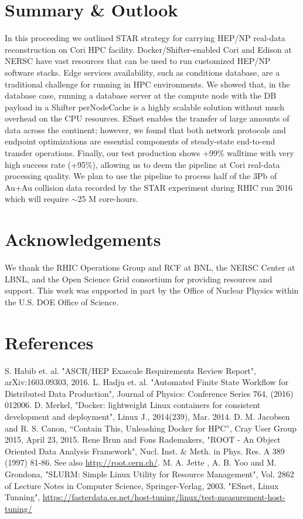 \documentclass[a4paper]{jpconf}
\begin{document}
\section{Summary \& Outlook}
In this proceeding we outlined STAR strategy for carrying HEP/NP real-data
reconstruction on Cori HPC facility. Docker/Shifter-enabled Cori and Edison at
NERSC have vast resources that can be used to run customized HEP/NP software
stacks. Edge services availability, such as conditions database, are a
traditional challenge for running in HPC environments. We showed that, in the
database case, running a database server at the compute node with the DB
payload in a Shifter perNodeCache is a highly scalable solution without much
overhead on the CPU resources. ESnet enables the transfer of large amounts of
data across the continent; however, we found that both network protocols and
endpoint optimizations are essential components of steady-state end-to-end
transfer operations.  Finally, our test production shows +99\% walltime with
very high success rate (+95\%), allowing us to deem the pipeline at Cori
real-data processing quality. We plan to use the pipeline to process half of
the 3Pb of Au+Au collision data recorded by the STAR experiment during RHIC run
2016 which  will require $\sim$25 M core-hours. 

\section{Acknowledgements}
We thank the RHIC Operations Group and RCF at BNL, the NERSC Center at LBNL, and the Open Science Grid consortium for providing resources and support. This work was supported in part by the Office of Nuclear Physics within the U.S. DOE Office of Science.

\section*{References}
\begin{thebibliography}{9}
 S. Habib et. al. "ASCR/HEP Exascale Requirements Review Report",  arXiv:1603.09303, 2016.
 L. Hadju et. al. "Automated Finite State Workflow for Distributed Data Production", Journal of Physics: Conference Series 764, (2016) 012006.
 D. Merkel, "Docker: lightweight Linux containers for consistent development and deployment", Linux J., 2014(239), Mar. 2014.
 D. M. Jacobsen and R. S. Canon, “Contain This, Unleashing Docker for HPC”, Cray User Group 2015, April 23, 2015.
 Rene Brun and Fons Rademakers, "ROOT - An Object Oriented Data Analysis Framework", Nucl. Inst. \& Meth. in Phys. Res. A 389 (1997) 81-86. See also \url{http://root.cern.ch/}.
 M. A. Jette , A. B. Yoo and  M. Grondona, "SLURM: Simple Linux Utility for Resource Management", Vol. 2862 of Lecture Notes in Computer Science, Springer-Verlag, 2003.
 "ESnet, Linux Tunning", \url{https://fasterdata.es.net/host-tuning/linux/test-measurement-host-tuning/}
\end{thebibliography}
\end{document}
